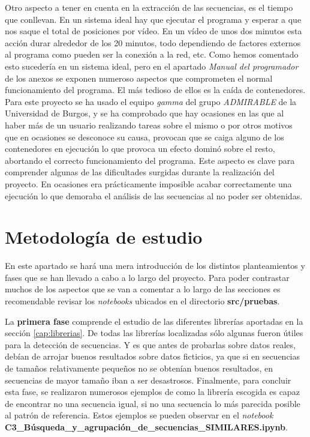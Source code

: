 Otro aspecto a tener en cuenta en la extracción de las secuencias, es el tiempo que conllevan. En un sistema ideal hay que ejecutar el programa y esperar a que nos saque el total de posiciones por vídeo. En un vídeo de unos dos minutos esta acción durar alrededor de los 20 minutos, todo dependiendo de factores externos al programa como pueden ser la conexión a la red, etc. Como hemos comentado esto sucedería en un sistema ideal, pero en el apartado \textit{Manual del programador} de los anexos se exponen numeroso aspectos que comprometen el normal funcionamiento del programa. El más tedioso de ellos es la caída de contenedores. Para este proyecto se ha usado el equipo \textit{gamma} del grupo \textit{ADMIRABLE} de la Universidad de Burgos, y se ha comprobado que hay ocasiones en las que al haber más de un usuario realizando tareas sobre el mismo o por otros motivos que en ocasiones se desconoce su causa, provocan que se caiga alguno de los contenedores en ejecución lo que provoca un efecto dominó sobre el resto, abortando el correcto funcionamiento del programa. Este aspecto es clave para comprender algunas de las dificultades surgidas durante la realización del proyecto. En ocasiones era prácticamente imposible acabar correctamente una ejecución lo que demoraba el análisis de las secuencias al no poder ser obtenidas. 


\section{Metodología de estudio}

En este apartado se hará una mera introducción de los distintos planteamientos y fases que se han llevado a cabo a lo largo del proyecto. Para poder contrastar muchos de los aspectos que se van a comentar a lo largo de las secciones es recomendable revisar los \textit{notebooks} ubicados en el directorio \textbf{src/pruebas}. 

La \textbf{primera fase} comprende el estudio de las diferentes librerías aportadas en la sección \ref{cap:librerias}. De todas las librerías localizadas sólo algunas fueron útiles para la detección de secuencias. Y es que antes de probarlas sobre datos reales, debían de arrojar buenos resultados sobre datos ficticios, ya que si en secuencias de tamaños relativamente pequeños no se obtenían buenos resultados, en secuencias de mayor tamaño iban a ser desastrosos. Finalmente, para concluir esta fase, se realizaron numerosos ejemplos de como la librería escogida es capaz de encontrar no una secuencia igual, si no una secuencia lo más parecida posible al patrón de referencia. Estos ejemplos se pueden observar en el \textit{notebook} \textbf{C3\_Búsqueda\_y\_agrupación\_de\_secuencias\_SIMILARES.ipynb}.

